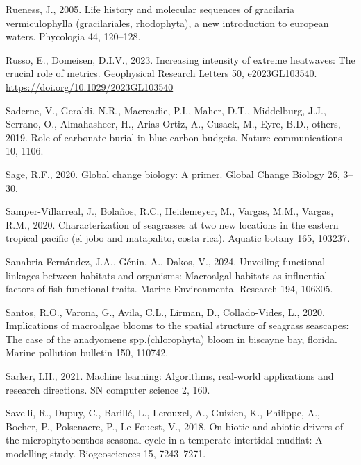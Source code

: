 \documentclass[
  letterpaper,
  11pt,
  english,
  singlespacing,
  headsepline]{MastersDoctoralThesis}
\newlength{\cslhangindent}
\newenvironment{CSLReferences}[2] %
 {\begin{list}{}{%
  \setlength{\itemindent}{0pt}
  \setlength{\leftmargin}{0pt}
  \setlength{\parsep}{0pt}
  \ifodd #1
   \setlength{\leftmargin}{\cslhangindent}
   \setlength{\itemindent}{-1\cslhangindent}
  \fi
  \setlength{\itemsep}{#2\baselineskip}}}
 {\end{list}}
\begin{document}
\begin{CSLReferences}{1}{0}
Rueness, J., 2005. Life history and molecular sequences of gracilaria
vermiculophylla (gracilariales, rhodophyta), a new introduction to
european waters. Phycologia 44, 120--128.

Russo, E., Domeisen, D.I.V., 2023. Increasing intensity of extreme
heatwaves: The crucial role of metrics. Geophysical Research Letters 50,
e2023GL103540. \url{https://doi.org/10.1029/2023GL103540}

Saderne, V., Geraldi, N.R., Macreadie, P.I., Maher, D.T., Middelburg,
J.J., Serrano, O., Almahasheer, H., Arias-Ortiz, A., Cusack, M., Eyre,
B.D., others, 2019. Role of carbonate burial in blue carbon budgets.
Nature communications 10, 1106.

Sage, R.F., 2020. Global change biology: A primer. Global Change Biology
26, 3--30.

Samper-Villarreal, J., Bolaños, R.C., Heidemeyer, M., Vargas, M.M.,
Vargas, R.M., 2020. Characterization of seagrasses at two new locations
in the eastern tropical pacific (el jobo and matapalito, costa rica).
Aquatic botany 165, 103237.

Sanabria-Fernández, J.A., Génin, A., Dakos, V., 2024. Unveiling
functional linkages between habitats and organisms: Macroalgal habitats
as influential factors of fish functional traits. Marine Environmental
Research 194, 106305.

Santos, R.O., Varona, G., Avila, C.L., Lirman, D., Collado-Vides, L.,
2020. Implications of macroalgae blooms to the spatial structure of
seagrass seascapes: The case of the anadyomene spp.(chlorophyta) bloom
in biscayne bay, florida. Marine pollution bulletin 150, 110742.

Sarker, I.H., 2021. Machine learning: Algorithms, real-world
applications and research directions. SN computer science 2, 160.

Savelli, R., Dupuy, C., Barillé, L., Lerouxel, A., Guizien, K.,
Philippe, A., Bocher, P., Polsenaere, P., Le Fouest, V., 2018. On biotic
and abiotic drivers of the microphytobenthos seasonal cycle in a
temperate intertidal mudflat: A modelling study. Biogeosciences 15,
7243--7271.


\end{CSLReferences}
\end{document}
